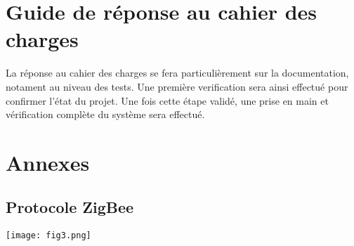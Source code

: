 \section{Guide de réponse au cahier des charges}
La réponse au cahier des charges se fera particulièrement sur la documentation, notament au niveau des tests. Une première verification sera ainsi effectué pour confirmer l'état du projet. Une fois cette étape validé, une prise en main et vérification complète du système sera effectué.

\section{Annexes}
\subsection{Protocole ZigBee}

\texttt{[image: fig3.png]}


